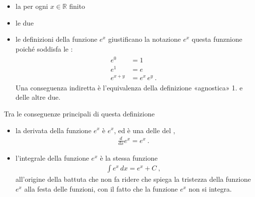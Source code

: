 \documentclass[letterpaper,10pt,italian]{jupyterBook}
\begin{document}
\begin{itemize}
\item {} 
\sphinxAtStartPar
la {\hyperref[\detokenize{ch/precalculus/exponential_logarithm-notes:math-hs-exp-log-notes-convergence}]{}} per ogni \(x \in \mathbb{R}\) finito

\item {} 
\sphinxAtStartPar
le due {\hyperref[\detokenize{ch/precalculus/exponential_logarithm-notes:math-hs-exp-log-notes-equivalence}]{}}

\item {} 
\sphinxAtStartPar
le definizioni della funzione \(e^x\) giustificano la notazione \(e^x\) questa funznione poiché soddisfa le {\hyperref[\detokenize{ch/precalculus/exponential_logarithm-notes:math-hs-exp-log-notes-powers}]{}}:
\begin{equation*}
\begin{split}\begin{aligned}
    e^0 & = 1 \\
    e^1 & = e \\
    e^{x+y} & = e^x \, e^y \ .
  \end{aligned}\end{split}
\end{equation*}
\sphinxAtStartPar
Una conseguenza indiretta è l’equivalenza della definizione «agnostica» 1. e delle altre due.

\end{itemize}

\sphinxAtStartPar
Tra le conseguenze principali di questa definizione
\begin{itemize}
\item {} 
\sphinxAtStartPar
la derivata della funzione \(e^x\) è \(e^x\), ed è una delle {\hyperref[\detokenize{ch/infinitesimal_calculus/derivatives:infinitesimal-calculus-derivatives-fund}]{}} del {\hyperref[\detokenize{ch/infinitesimal_calculus/derivatives:infinitesimal-calculus-derivatives}]{}},
\begin{equation*}
\begin{split}\frac{d}{dx} e^x = e^x \ .\end{split}
\end{equation*}
\item {} 
\sphinxAtStartPar
l’integrale della funzione \(e^x\) è la stessa funzione
\begin{equation*}
\begin{split}\int e^x \, dx = e^x + C \ ,\end{split}
\end{equation*}
\sphinxAtStartPar
all’origine della battuta che non fa ridere \sphinxstylestrong{(!)} che spiega la tristezza della funzione \(e^x\) alla festa delle funzioni, con il fatto che la funzione \(e^x\) non si integra.

\end{itemize}
\end{document}
